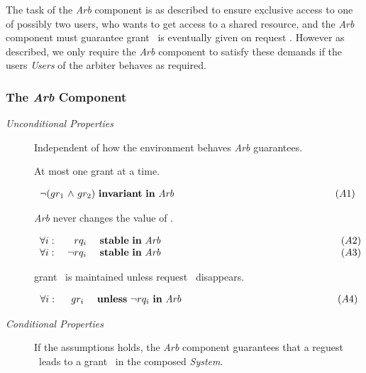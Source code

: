 The task of the {\it Arb} component is as described to ensure exclusive access 
to one of possibly two users, who wants to get access to a shared resource, and
the {\it Arb} component must guarantee grant \gri\ is eventually given on 
request \rqi.  However as described, we only require the {\it Arb} component to
satisfy these demands if the users {\it Users} of the arbiter behaves as 
required.

\subsubsection{The {\it Arb} Component}

\begin{description}
  \item [{\it Unconditional Properties}] \nl
      
      Independent of how the environment behaves {\it Arb} guarantees.

      \smallskip
      At most one grant at a time.

      \cn $\begin{array}{lr}
        \mnot(\gra\ \mand\ \grb)\ \invariant\ \mmin\ {\it Arb} &
          \hspace{153pt} (A1)\\
      \end{array}$

      {\it Arb} never changes the value of \rqi.

      \cn $\begin{array}{lrlr}
        \mforall\ & \rqi\ & \stable\ \mmin\ {\it Arb}       &
          \hspace{172pt} (A2)\\
        \mforall\ &  \mnot\rqi\ & \stable\ \mmin\ {\it Arb} & (A3)\\
      \end{array}$

      grant \gri\ is maintained unless request \rqi\ disappears.
      
      \cn $\begin{array}{lrlr}
        \mforall\ & \ \gri\ & \unless\ \mnot\rqi\ \mmin\ {\it Arb}   &
          \hspace{148pt} (A4)\\
      \end{array}$

  \item [{\it Conditional Properties}] \nl

      If the assumptions holds, the {\it Arb} component guarantees
      that a reguest \rqi\ leads to a grant \gri\ in the composed
      {\it System}.


\end{description}
